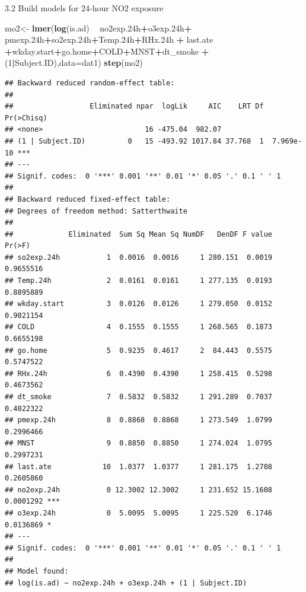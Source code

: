 \documentclass[12pt,]{article}
\newenvironment{Shaded}{\begin{snugshade}}{\end{snugshade}}
\newcommand{\DataTypeTok}[1]{\textcolor[rgb]{0.13,0.29,0.53}{#1}}
\newcommand{\DecValTok}[1]{\textcolor[rgb]{0.00,0.00,0.81}{#1}}
\newcommand{\FloatTok}[1]{\textcolor[rgb]{0.00,0.00,0.81}{#1}}
\newcommand{\KeywordTok}[1]{\textcolor[rgb]{0.13,0.29,0.53}{\textbf{#1}}}
\newcommand{\NormalTok}[1]{#1}
\newcommand{\OperatorTok}[1]{\textcolor[rgb]{0.81,0.36,0.00}{\textbf{#1}}}
\newcommand{\StringTok}[1]{\textcolor[rgb]{0.31,0.60,0.02}{#1}}
\begin{document}
3.2 Build models for 24-hour NO2 exposure

\begin{Shaded}
\begin{Highlighting}[]
\NormalTok{mo2<-}\StringTok{ }\KeywordTok{lmer}\NormalTok{(}\KeywordTok{log}\NormalTok{(is.ad) }\OperatorTok{~}\StringTok{ }\NormalTok{no2exp}\FloatTok{.24}\NormalTok{h}\OperatorTok{+}\NormalTok{o3exp}\FloatTok{.24}\NormalTok{h}\OperatorTok{+}\StringTok{ }\NormalTok{pmexp}\FloatTok{.24}\NormalTok{h}\OperatorTok{+}\NormalTok{so2exp}\FloatTok{.24}\NormalTok{h}\OperatorTok{+}\NormalTok{Temp}\FloatTok{.24}\NormalTok{h}\OperatorTok{+}\NormalTok{RHx}\FloatTok{.24}\NormalTok{h }\OperatorTok{+}\StringTok{ }\NormalTok{last.ate }\OperatorTok{+}\NormalTok{wkday.start}\OperatorTok{+}\NormalTok{go.home}\OperatorTok{+}\NormalTok{COLD}\OperatorTok{+}\NormalTok{MNST}\OperatorTok{+}\NormalTok{dt_smoke }\OperatorTok{+}\NormalTok{(}\DecValTok{1}\OperatorTok{|}\NormalTok{Subject.ID),}\DataTypeTok{data=}\NormalTok{dat1)}
\KeywordTok{step}\NormalTok{(mo2)}
\end{Highlighting}
\end{Shaded}

\begin{verbatim}
## Backward reduced random-effect table:
## 
##                  Eliminated npar  logLik     AIC    LRT Df Pr(>Chisq)    
## <none>                        16 -475.04  982.07                         
## (1 | Subject.ID)          0   15 -493.92 1017.84 37.768  1  7.969e-10 ***
## ---
## Signif. codes:  0 '***' 0.001 '**' 0.01 '*' 0.05 '.' 0.1 ' ' 1
## 
## Backward reduced fixed-effect table:
## Degrees of freedom method: Satterthwaite 
## 
##             Eliminated  Sum Sq Mean Sq NumDF   DenDF F value    Pr(>F)    
## so2exp.24h           1  0.0016  0.0016     1 280.151  0.0019 0.9655516    
## Temp.24h             2  0.0161  0.0161     1 277.135  0.0193 0.8895889    
## wkday.start          3  0.0126  0.0126     1 279.050  0.0152 0.9021154    
## COLD                 4  0.1555  0.1555     1 268.565  0.1873 0.6655198    
## go.home              5  0.9235  0.4617     2  84.443  0.5575 0.5747522    
## RHx.24h              6  0.4390  0.4390     1 258.415  0.5298 0.4673562    
## dt_smoke             7  0.5832  0.5832     1 291.289  0.7037 0.4022322    
## pmexp.24h            8  0.8868  0.8868     1 273.549  1.0799 0.2996466    
## MNST                 9  0.8850  0.8850     1 274.024  1.0795 0.2997231    
## last.ate            10  1.0377  1.0377     1 281.175  1.2708 0.2605860    
## no2exp.24h           0 12.3002 12.3002     1 231.652 15.1608 0.0001292 ***
## o3exp.24h            0  5.0095  5.0095     1 225.520  6.1746 0.0136869 *  
## ---
## Signif. codes:  0 '***' 0.001 '**' 0.01 '*' 0.05 '.' 0.1 ' ' 1
## 
## Model found:
## log(is.ad) ~ no2exp.24h + o3exp.24h + (1 | Subject.ID)
\end{verbatim}
\end{document}
